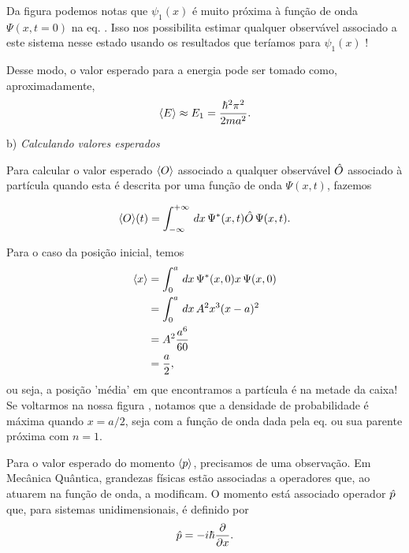 \documentclass[red]{mecanica_quantica}
\begin{document}
 


Da figura  podemos notas que $\psi_1(x)$ é muito próxima à função de onda $\Psi(x,t=0)$ na eq. . Isso nos possibilita estimar qualquer observável associado a este sistema nesse estado usando os resultados que teríamos para $\psi_1(x)$ ! 

Desse modo, o valor esperado para a energia pode ser tomado como, aproximadamente,
	\begin{equation}
	\label{eq:Eapprox}
	\langle E\rangle \approx E_1 = \frac{\hbar^2 \pi^2}{2m a^2}.
	\end{equation}

	
	b) \emph{Calculando valores esperados}
	
	Para calcular o valor esperado $\langle O\rangle$ associado a qualquer observável $\hat{O}$ associado à partícula quando esta é descrita por uma função de onda $\Psi(x,t)$, 
	fazemos
	
	\begin{equation}
	\label{eq:calcvaloresperado}
		\langle O\rangle(t) = \int_{-\infty}^{+\infty} \, dx \,  \Psi^*(x,t) \hat{O} \,  \Psi(x,t)
		.
	\end{equation}


	Para o caso da posição inicial, temos
	\begin{align}
	\label{eq:x0esp}
		\langle x\rangle & = \int_{0}^{a} \, dx \,  \Psi^*(x,0) x \,  \Psi(x,0) \nonumber \\
		& = \int_{0}^{a} \, dx \,  A^2 x^3 (x-a)^2 \nonumber \\
		& = A^2 \frac{a^6}{60} \nonumber \\
		& = \frac{a}{2},
	\end{align}
	ou seja, a posição 'média' em que encontramos a partícula é na metade da caixa!
	Se voltarmos na nossa figura , notamos que a densidade de probabilidade é máxima quando $x=a/2$, seja com a função de onda dada pela eq.  ou sua parente próxima  com $n=1$.
	
	Para o valor esperado do momento $\langle p\rangle$, precisamos de uma observação. Em Mecânica Quântica, grandezas físicas estão associadas a operadores que, ao atuarem na função de onda, a modificam. O momento está associado operador $\hat{p}$ que, para sistemas unidimensionais, é definido por 
	\begin{equation}
		\label{eq:operadorp}
		\hat{p} = -i\hbar \frac{\partial}{\partial x}.
	 \end{equation} 
	 
\end{document}
